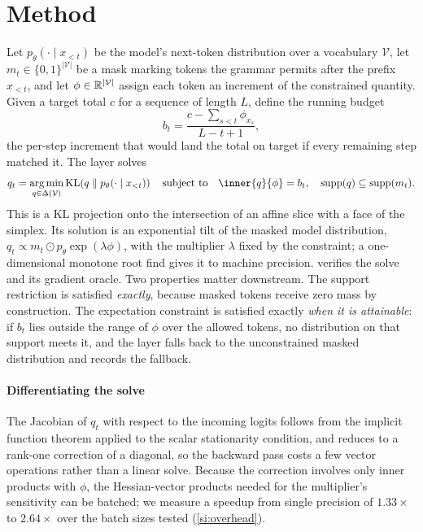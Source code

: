 \section{Method}
\label{sec:method}

Let $p_\theta(\cdot \mid x_{<t})$ be the model's next-token distribution over a
vocabulary $\mathcal{V}$, let $m_t \in \{0,1\}^{|\mathcal{V}|}$ be a mask marking tokens
the grammar permits after the prefix $x_{<t}$, and let $\phi \in \mathbb{R}^{|\mathcal{V}|}$
assign each token an increment of the constrained quantity. Given a target total $c$
for a sequence of length $L$, define the running budget
\begin{equation}
  b_t = \frac{c - \sum_{s<t} \phi_{x_s}}{L - t + 1},
  \label{eq:budget}
\end{equation}
the per-step increment that would land the total on target if every remaining step
matched it. The layer solves
\begin{equation}
  q_t = \argmin_{q \in \Delta(\mathcal{V})}
        \KL\!\left(q \;\|\; p_\theta(\cdot \mid x_{<t})\right)
  \quad \text{subject to} \quad
  \inner{q}{\phi} = b_t, \quad \operatorname{supp}(q) \subseteq \operatorname{supp}(m_t).
  \label{eq:projection}
\end{equation}
This is a KL projection onto the intersection of an affine slice with a face of the
simplex. Its solution is an exponential tilt of the masked model distribution,
$q_t \propto m_t \odot p_\theta \exp(\lambda \phi)$, with the multiplier $\lambda$ fixed
by the constraint; a one-dimensional monotone root find gives it to machine precision.
 verifies the solve and its gradient oracle. Two properties matter
downstream. The support restriction is satisfied
\emph{exactly}, because masked tokens receive zero mass by construction. The
expectation constraint is satisfied exactly \emph{when it is attainable}: if $b_t$ lies
outside the range of $\phi$ over the allowed tokens, no distribution on that support
meets it, and the layer falls back to the unconstrained masked distribution and records
the fallback.

\paragraph{Differentiating the solve}
The Jacobian of $q_t$ with respect to the incoming logits follows from the implicit
function theorem applied to the scalar stationarity condition, and reduces to a rank-one
correction of a diagonal, so the backward pass costs a few vector operations rather
than a linear solve. Because the correction involves only inner products with $\phi$, the
Hessian-vector products needed for the multiplier's sensitivity can be batched; we
measure a speedup from single precision of
$1.33\times$ to $2.64\times$ over the batch sizes tested (\cref{si:overhead}).

